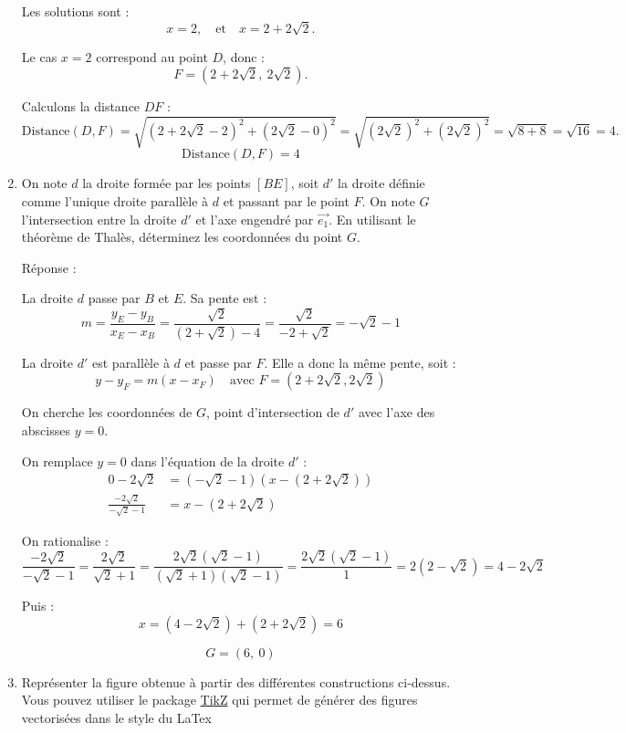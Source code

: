 \documentclass[a4paper,12pt]{article}
\begin{document}
\begin{enumerate}
  Les solutions sont :
  \[
  \boxed{x = 2,}\quad \text{et} \quad \boxed{x = 2 + 2\sqrt{2}}.
  \]

  Le cas $x = 2$ correspond au point $D$, donc :
  \[
  \boxed{
  F = \left(2 + 2\sqrt{2},\ 2\sqrt{2} \right).
  }
  \]

  Calculons la distance $DF$ :
  \[
  \text{Distance}(D, F) = \sqrt{(2 + 2\sqrt{2} - 2)^2 + (2\sqrt{2} - 0)^2} = \sqrt{(2\sqrt{2})^2 + (2\sqrt{2})^2} = \sqrt{8 + 8} = \sqrt{16} = 4.
  \]
  \[
  \boxed{
  \text{Distance}(D, F) = 4
  }
  \]
\newline
   \item On note $d$ la droite formée par les points $[BE]$, soit $d'$ la droite définie comme l'unique droite parallèle à $d$ et passant par le point $F$. On note $G$ l'intersection entre la droite $d'$ et l'axe engendré par $\vec{e_1}$. En utilisant le théorème de Thalès, déterminez les coordonnées du point $G$. 

  Réponse :

La droite \( d \) passe par \( B \) et \( E \). Sa pente est :
\[
m = \frac{y_E - y_B}{x_E - x_B} = \frac{\sqrt{2}}{(2 + \sqrt{2}) - 4} = \frac{\sqrt{2}}{-2 + \sqrt{2}} = -\sqrt{2} - 1
\]

La droite \( d' \) est parallèle à \( d \) et passe par \( F \). Elle a donc la même pente, soit :
\[
y - y_F = m(x - x_F) \quad \text{avec } F = (2 + 2\sqrt{2}, 2\sqrt{2})
\]

On cherche les coordonnées de \( G \), point d'intersection de \( d' \) avec l'axe des abscisses \( y = 0 \).

On remplace \( y = 0 \) dans l'équation de la droite \( d' \) :
\begin{align*}
0 - 2\sqrt{2} &= (-\sqrt{2} - 1)(x - (2 + 2\sqrt{2})) \\
\frac{-2\sqrt{2}}{-\sqrt{2} - 1} &= x - (2 + 2\sqrt{2})
\end{align*}

On rationalise :
\[
\frac{-2\sqrt{2}}{-\sqrt{2} - 1} = \frac{2\sqrt{2}}{\sqrt{2} + 1} = \frac{2\sqrt{2}(\sqrt{2} - 1)}{(\sqrt{2} + 1)(\sqrt{2} - 1)} = \frac{2\sqrt{2}(\sqrt{2} - 1)}{1} = 2(2 - \sqrt{2}) = 4 - 2\sqrt{2}
\]

Puis :
\[
x = (4 - 2\sqrt{2}) + (2 + 2\sqrt{2}) = 6
\]

\[
\boxed{G = (6,\ 0)}
\]
\newpage
   \item Représenter la figure obtenue à partir des différentes constructions ci-dessus. Vous pouvez utiliser le package \href{https://www.overleaf.com/learn/latex/TikZ_package}{TikZ} qui permet de générer des figures vectorisées dans le style du LaTex


\end{enumerate}
\end{document}
